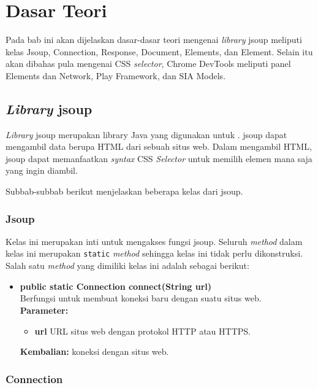 \chapter{Dasar Teori}
\label{chap:Dasar Teori}

Pada bab ini akan dijelaskan dasar-dasar teori mengenai \textit{library} jsoup meliputi kelas Jsoup, Connection, Response, Document, Elements, dan Element. Selain itu akan dibahas pula mengenai CSS \textit{selector}, Chrome DevTools meliputi panel Elements dan Network, Play Framework, dan SIA Models.

\section{\textit{Library} jsoup}
\label{sec:jsoup}

\textit{Library} jsoup merupakan library Java yang digunakan untuk \cite{jsoup}. jsoup dapat mengambil data berupa HTML dari sebuah situs web. Dalam mengambil HTML, jsoup dapat memanfaatkan \textit{syntax} CSS \textit{Selector} untuk memilih elemen mana saja yang ingin diambil. 

Subbab-subbab berikut menjelaskan beberapa kelas dari jsoup.

\subsection{Jsoup}

Kelas ini merupakan inti untuk mengakses fungsi jsoup. Seluruh \textit{method} dalam kelas ini merupakan \texttt{static} \textit{method} sehingga kelas ini tidak perlu dikonstruksi. Salah satu \textit{method} yang dimiliki kelas ini adalah sebagai berikut:
\begin{itemize}
	\item \textbf{public static Connection connect(String url)} \\
		Berfungsi untuk membuat koneksi baru dengan suatu situs web. \\
		\textbf{Parameter:}
		\begin{itemize}
			\item \textbf{url} URL situs web dengan protokol HTTP atau HTTPS.
		\end{itemize}
		\textbf{Kembalian:} koneksi dengan situs web.
\end{itemize}

\subsection{Connection}

